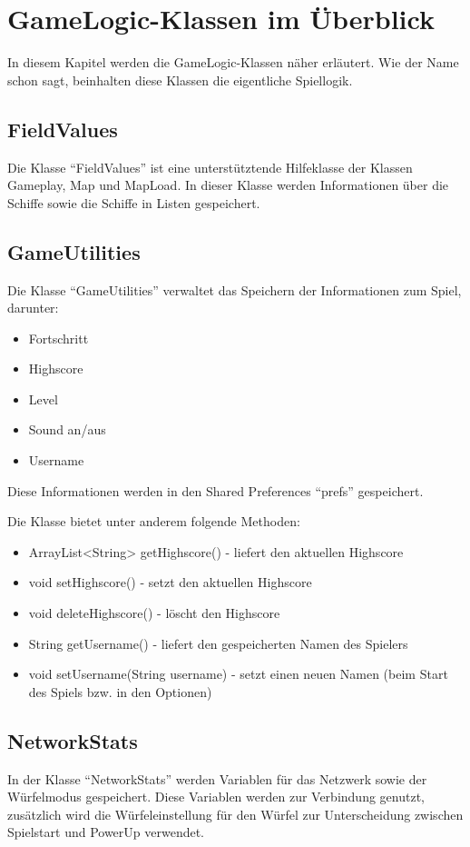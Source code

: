 \documentclass[11pt]{article} %
\begin{document}
\section{GameLogic-Klassen im Überblick}
In diesem Kapitel werden die GameLogic-Klassen näher erläutert. Wie der Name schon sagt, beinhalten diese Klassen die eigentliche Spiellogik.

\subsection{FieldValues}
Die Klasse \enquote{FieldValues} ist eine unterstütztende Hilfeklasse der Klassen Gameplay, Map und MapLoad. In dieser Klasse werden Informationen über die Schiffe sowie die Schiffe in Listen gespeichert.

\subsection{GameUtilities}
Die Klasse \enquote{GameUtilities} verwaltet das Speichern der Informationen zum Spiel, darunter:
\begin{itemize}
\item Fortschritt
\item Highscore
\item Level
\item Sound an/aus
\item Username
\end{itemize}

Diese Informationen werden in den Shared Preferences \enquote{prefs} gespeichert. 

Die Klasse bietet unter anderem folgende Methoden:
\begin{itemize}
\item ArrayList<String> getHighscore() - liefert den aktuellen Highscore
\item void setHighscore() - setzt den aktuellen Highscore
\item void deleteHighscore() - löscht den Highscore

\item String getUsername() - liefert den gespeicherten Namen des Spielers
\item void setUsername(String username) - setzt einen neuen Namen (beim Start des Spiels bzw. in den Optionen)
\end{itemize}

\subsection{NetworkStats}
In der Klasse \enquote{NetworkStats} werden Variablen für das Netzwerk sowie der Würfelmodus gespeichert. Diese Variablen werden zur Verbindung genutzt, zusätzlich wird die Würfeleinstellung für den Würfel zur Unterscheidung zwischen Spielstart und PowerUp verwendet.
\end{document}
